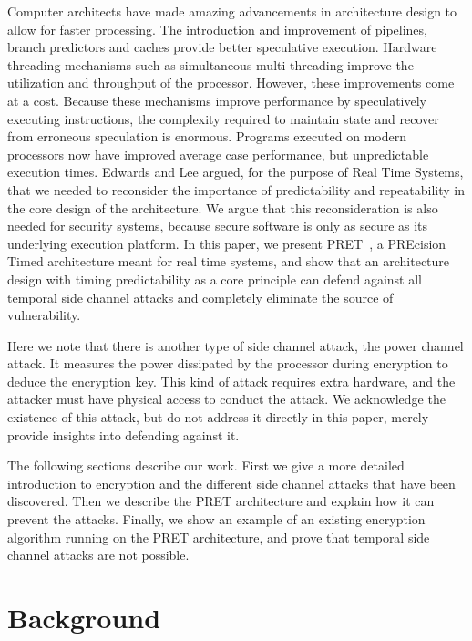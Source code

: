 \documentclass[times, 10pt,twocolumn]{article}
\begin{document}
Computer architects have made amazing advancements in architecture design to allow for faster processing. The introduction and improvement of pipelines, branch predictors and caches provide better speculative execution. Hardware threading mechanisms such as simultaneous multi-threading improve the utilization and throughput of the processor. However, these improvements come at a cost. Because these mechanisms improve performance by speculatively executing instructions, the complexity required to maintain state and recover from erroneous speculation is enormous. Programs executed on modern processors now have improved average case performance, but unpredictable execution times. Edwards and Lee\cite{edwards2007case} argued, for the purpose of Real Time Systems, that we needed to reconsider the importance of predictability and repeatability in the core design of the architecture. We argue that this reconsideration is also needed for security systems, because secure software is only as secure as its underlying execution platform. In this paper, we present PRET~\cite{pret_cases08}, a PREcision Timed architecture meant for real time systems, and show that an architecture design with timing predictability as a core principle can defend against all temporal side channel attacks and completely eliminate the source of vulnerability.    

Here we note that there is another type of side channel attack, the power channel attack. It measures the power dissipated by the processor during encryption to deduce the encryption key. This kind of attack requires extra hardware, and the attacker must have physical access to conduct the attack. We acknowledge the existence of this attack, but do not address it directly in this paper, merely provide insights into defending against it.
   
The following sections describe our work. First we give a more detailed introduction to encryption and the different side channel attacks that have been discovered. Then we describe the PRET architecture and explain how it can prevent the attacks. Finally, we show an example of an existing encryption algorithm running on the PRET architecture, and prove that temporal side channel attacks are not possible.
\section{Background}
\end{document}
